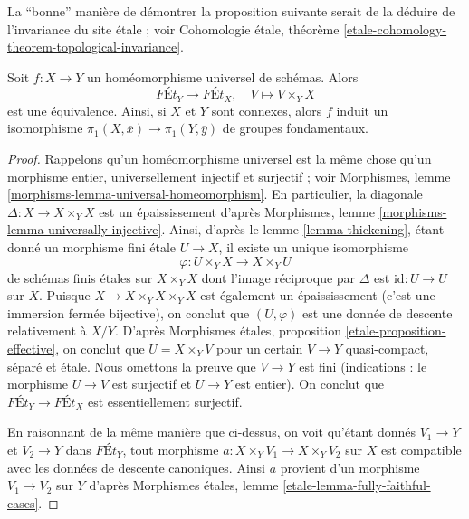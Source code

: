 \noindent
La ``bonne'' manière de démontrer la proposition suivante serait de
la déduire de l'invariance du site étale ; voir
Cohomologie étale, théorème
\ref{etale-cohomology-theorem-topological-invariance}.

\begin{proposition}
\label{proposition-universal-homeomorphism}
Soit $f : X \to Y$ un homéomorphisme universel de schémas. Alors
$$
\textit{F\'Et}_Y \longrightarrow \textit{F\'Et}_X,\quad
V \longmapsto V \times_Y X
$$
est une équivalence. Ainsi, si $X$ et $Y$ sont connexes, alors
$f$ induit un isomorphisme $\pi_1(X, \overline{x}) \to \pi_1(Y, \overline{y})$
de groupes fondamentaux.
\end{proposition}

\begin{proof}
Rappelons qu'un homéomorphisme universel est la même chose qu'un morphisme
entier, universellement injectif et surjectif ; voir
Morphismes, lemme \ref{morphisms-lemma-universal-homeomorphism}.
En particulier, la diagonale $\Delta : X \to X \times_Y X$ est un épaississement
d'après Morphismes, lemme \ref{morphisms-lemma-universally-injective}.
Ainsi, d'après le lemme \ref{lemma-thickening},
étant donné un morphisme fini étale $U \to X$,
il existe un unique isomorphisme
$$
\varphi : U \times_Y X \to X \times_Y U
$$
de schémas finis étales sur $X \times_Y X$ dont l'image réciproque par
$\Delta$ est $\text{id} : U \to U$ sur $X$.
Puisque $X \to X \times_Y X \times_Y X$
est également un épaississement (c'est une immersion fermée bijective),
on conclut que $(U, \varphi)$ est une donnée de descente relativement à $X/Y$.
D'après Morphismes étales, proposition \ref{etale-proposition-effective},
on conclut que $U = X \times_Y V$ pour un certain $V \to Y$
quasi-compact, séparé et étale.
Nous omettons la preuve que $V \to Y$ est fini (indications :
le morphisme $U \to V$ est surjectif et $U \to Y$ est entier).
On conclut que $\textit{F\'Et}_Y \to \textit{F\'Et}_X$
est essentiellement surjectif.

\medskip\noindent
En raisonnant de la même manière que ci-dessus, on voit qu'étant donnés
$V_1 \to Y$ et $V_2 \to Y$ dans $\textit{F\'Et}_Y$, tout
morphisme $a : X \times_Y V_1 \to X \times_Y V_2$ sur $X$
est compatible avec les données de descente canoniques. Ainsi $a$
provient d'un morphisme $V_1 \to V_2$ sur $Y$ d'après
Morphismes étales, lemme \ref{etale-lemma-fully-faithful-cases}.
\end{proof}










